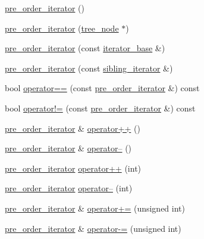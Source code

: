 \begin{CompactItemize}
\item 
\hyperlink{classtree_1_1pre__order__iterator_aa4abe430ae678fa7d7753d9599be049}{pre\_\-order\_\-iterator} ()
\item 
\hyperlink{classtree_1_1pre__order__iterator_afdaf0da69c4406b916c14c5589fa391}{pre\_\-order\_\-iterator} (\hyperlink{classtree__node__}{tree\_\-node} $\ast$)
\item 
\hyperlink{classtree_1_1pre__order__iterator_969cfeb31a2e92d1a64d9f2945bbedf7}{pre\_\-order\_\-iterator} (const \hyperlink{classtree_1_1iterator__base}{iterator\_\-base} \&)
\item 
\hyperlink{classtree_1_1pre__order__iterator_2705495c89beecc86107ca742a35507f}{pre\_\-order\_\-iterator} (const \hyperlink{classtree_1_1sibling__iterator}{sibling\_\-iterator} \&)
\item 
bool \hyperlink{classtree_1_1pre__order__iterator_ea8dee1bfc2450608b2b35d26a9f11b7}{operator==} (const \hyperlink{classtree_1_1pre__order__iterator}{pre\_\-order\_\-iterator} \&) const 
\item 
bool \hyperlink{classtree_1_1pre__order__iterator_14425c7743e9a6da2d96b172a85d2bed}{operator!=} (const \hyperlink{classtree_1_1pre__order__iterator}{pre\_\-order\_\-iterator} \&) const 
\item 
\hyperlink{classtree_1_1pre__order__iterator}{pre\_\-order\_\-iterator} \& \hyperlink{classtree_1_1pre__order__iterator_07b77d1591ad7f05e4531489561d36d2}{operator++} ()
\item 
\hyperlink{classtree_1_1pre__order__iterator}{pre\_\-order\_\-iterator} \& \hyperlink{classtree_1_1pre__order__iterator_4e2dd21653724b6413d9949caf9bb107}{operator--} ()
\item 
\hyperlink{classtree_1_1pre__order__iterator}{pre\_\-order\_\-iterator} \hyperlink{classtree_1_1pre__order__iterator_d99a34d4c6cbfaa1de621b276a363856}{operator++} (int)
\item 
\hyperlink{classtree_1_1pre__order__iterator}{pre\_\-order\_\-iterator} \hyperlink{classtree_1_1pre__order__iterator_9ccab7bd408c6d0a221f69d11f7f3717}{operator--} (int)
\item 
\hyperlink{classtree_1_1pre__order__iterator}{pre\_\-order\_\-iterator} \& \hyperlink{classtree_1_1pre__order__iterator_5ab66cd50ae22c9b246231b41b7720f5}{operator+=} (unsigned int)
\item 
\hyperlink{classtree_1_1pre__order__iterator}{pre\_\-order\_\-iterator} \& \hyperlink{classtree_1_1pre__order__iterator_722aedfd8f8be3490324a587d17cb133}{operator-=} (unsigned int)
\end{CompactItemize}

